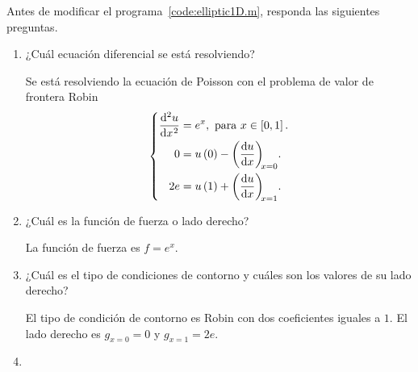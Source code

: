 \begin{problem}

Antes de modificar el programa~\ref{code:elliptic1D.m}, responda las
siguientes preguntas.

\begin{enumerate}
    \item

          ¿Cuál ecuación diferencial se está resolviendo?

          \begin{solution}
              Se está resolviendo la ecuación de Poisson con el
              problema de valor de frontera Robin
              \begin{equation}\label{eq:poisson1drobindconditions}
                  \left\{
                  \begin{aligned}
                      \diff[2]{u}{x}
                       & =e^{x},
                      \text{ para }x\in\left[0,1\right].     \\
                      0
                       & = u\left(0\right)-\diff{u}{x}[x=0]. \\
                      2e
                       & =u\left(1\right)+\diff{u}{x}[x=1].  \\
                  \end{aligned}
                  \right.
              \end{equation}
          \end{solution}

    \item

          ¿Cuál es la función de fuerza o lado derecho?

          \begin{solution}
              La función de fuerza es $f=e^{x}$.
          \end{solution}

    \item

          ¿Cuál es el tipo de condiciones de contorno y cuáles son
          los valores de su lado derecho?

          \begin{solution}
              El tipo de condición de contorno es Robin con dos
              coeficientes iguales a $1$.
              El lado derecho es $g_{x=0}=0$ y $g_{x=1}=2e$.
          \end{solution}

    \item


\end{enumerate}
\end{problem}
